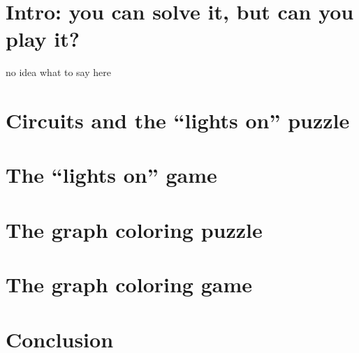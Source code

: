 \documentclass{extarticle}
\begin{document}
\section{Intro: you can solve it, but can you play it?}

no idea what to say here

\section{Circuits and the ``lights on'' puzzle}


\section{The ``lights on'' game}

\section{The graph coloring puzzle}

\section{The graph coloring game}

\section{Conclusion}
\end{document}
